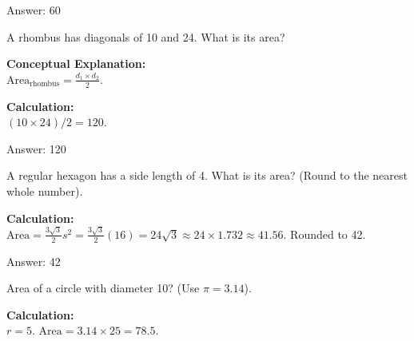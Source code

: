 \documentclass[11pt,paper=a4,answers]{exam}
\begin{document}
\begin{questions}
\begin{solution}
\vspace{30pt}

Answer: \colorbox{yellow!100}{60}
\end{solution}

\vspace{60pt}

\question
A rhombus has diagonals of 10 and 24. What is its area?

\begin{solution}
\textbf{Conceptual Explanation:} \\
$\text{Area}_{\text{rhombus}} = \frac{d_1 \times d_2}{2}$.

\vspace{30pt}

\textbf{Calculation:} \\
$(10 \times 24) / 2 = 120$.

\vspace{30pt}

Answer: \colorbox{yellow!100}{120}
\end{solution}

\vspace{60pt}

\question
A regular hexagon has a side length of 4. What is its area? (Round to the nearest whole number).

\begin{solution}
\textbf{Calculation:} \\
$\text{Area} = \frac{3\sqrt{3}}{2}s^2 = \frac{3\sqrt{3}}{2}(16) = 24\sqrt{3} \approx 24 \times 1.732 \approx 41.56$. Rounded to 42.

\vspace{30pt}

Answer: \colorbox{yellow!100}{42}
\end{solution}

\vspace{60pt}

\question
Area of a circle with diameter 10? (Use $\pi = 3.14$).

\begin{solution}
\textbf{Calculation:} \\
$r = 5$. $\text{Area} = 3.14 \times 25 = 78.5$.

\vspace{30pt}


\end{solution}
\end{questions}
\end{document}
